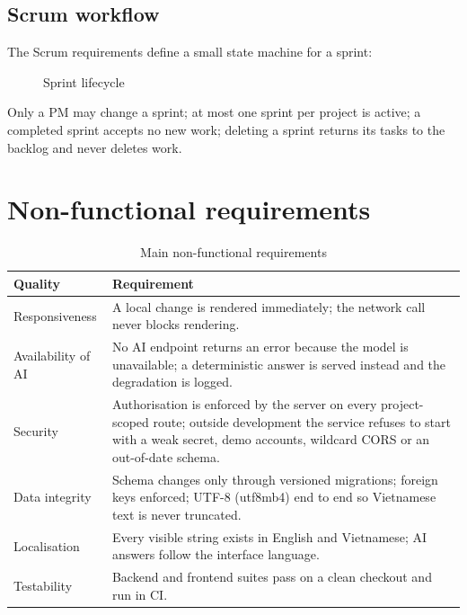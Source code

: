 \documentclass[../main.tex]{subfiles}
\begin{document}
\subsection{Scrum workflow}
The Scrum requirements define a small state machine for a sprint:
\begin{figure}[H]
\centering
{}
\caption{Sprint lifecycle}\label{fig:sprint-states}
\end{figure}
Only a PM may change a sprint; at most one sprint per project is active; a completed sprint accepts
no new work; deleting a sprint returns its tasks to the backlog and never deletes work.

\section{Non-functional requirements}
\begin{table}[H]
\centering
\caption{Main non-functional requirements}\label{tab:nfr}
\renewcommand{\arraystretch}{1.25}
\begin{tabular}{|p{2.9cm}|p{10.8cm}|}
\hline
\textbf{Quality} & \textbf{Requirement} \\ \hline
Responsiveness & A local change is rendered immediately; the network call never blocks rendering. \\ \hline
Availability of AI & No AI endpoint returns an error because the model is unavailable; a deterministic answer is served instead and the degradation is logged. \\ \hline
Security & Authorisation is enforced by the server on every project-scoped route; outside development the service refuses to start with a weak secret, demo accounts, wildcard CORS or an out-of-date schema. \\ \hline
Data integrity & Schema changes only through versioned migrations; foreign keys enforced; UTF-8 (utf8mb4) end to end so Vietnamese text is never truncated. \\ \hline
Localisation & Every visible string exists in English and Vietnamese; AI answers follow the interface language. \\ \hline
Testability & Backend and frontend suites pass on a clean checkout and run in CI. \\ \hline
\end{tabular}
\end{table}
\end{document}
